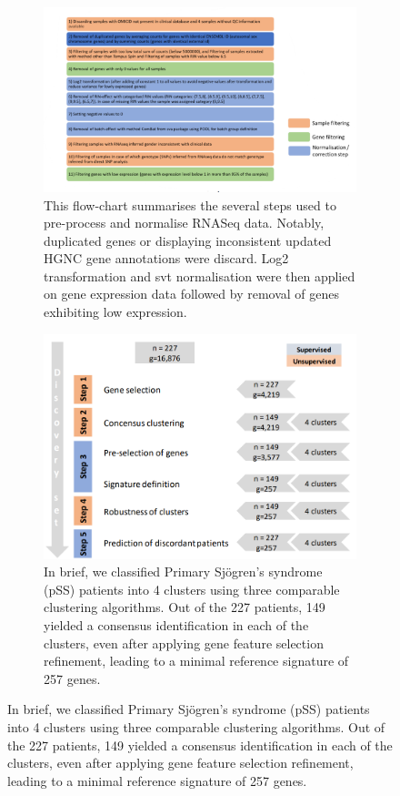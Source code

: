 \documentclass[mainlanguage=english,numlaboratories=2, nofrontcover=true,noaim=false, localbibs, colophon-location=verso-frontcover, oneside, 10pt, localtocs, version=final, nomakeabstract=true]{yathesis}
\begin{document}
{\begin{figure}
     \centering
     \begin{subfigure}[p]{0.6\textwidth}
         \centering
         \includegraphics[width=\textwidth]{figures/sjogren/pre-processing.png}
         \caption[\textbf{RNAseq analysis flowchart}]{This flow-chart summarises the several steps used to pre-process and normalise RNASeq data. Notably, duplicated genes or displaying inconsistent updated HGNC gene annotations were discard. Log2 transformation and svt normalisation were then applied on gene expression data followed by removal of genes exhibiting low expression.}
         \label{subfig:rnaseq-sjogren-pipeline}
     \end{subfigure}
     \hfill
     \begin{subfigure}[p]{0.35\textwidth}
         \centering
         \includegraphics[width=\textwidth]{figures/sjogren/consensus_clustering.png}
         \caption[Flow chart of \enquote{semi-supervised} hierarchical clustering]{In brief, we classified Primary Sjögren’s syndrome (pSS) patients into 4 clusters using three comparable clustering algorithms. Out of the 227 patients, 149 yielded a consensus identification in each of the clusters, even after applying gene feature selection refinement, leading to a minimal reference signature of 257 genes. }

\end{subfigure}
\end{figure}}
\end{document}
